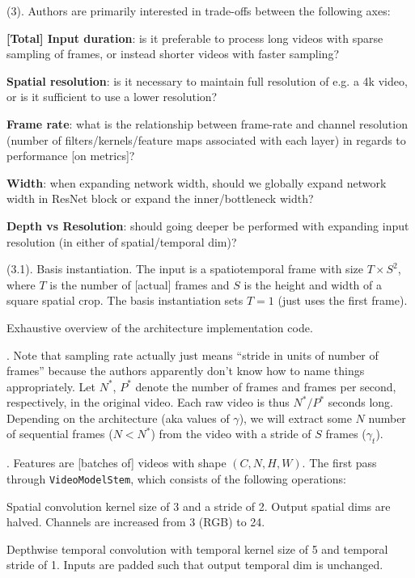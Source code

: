 \documentclass[11pt]{article}
\begin{document}
 (3). Authors are primarily interested in trade-offs between the following axes:
\begin{compactitem}
	\item \textbf{[Total] Input duration}: is it preferable to process long videos with sparse sampling of frames, or instead shorter videos with faster sampling? 
	
	\item \textbf{Spatial resolution}: is it necessary to maintain full resolution of e.g. a 4k video, or is it sufficient to use a lower resolution? 
	
	\item \textbf{Frame rate}: what is the relationship between frame-rate and channel resolution (number of filters/kernels/feature maps associated with each layer) in regards to performance [on metrics]?
	
	\item \textbf{Width}: when expanding network width, should we globally expand network width in ResNet block or expand the inner/bottleneck width?
	
	\item \textbf{Depth vs Resolution}: should going deeper be performed with expanding input resolution (in either of spatial/temporal dim)?
\end{compactitem}

 (3.1). Basis instantiation. The input is a spatiotemporal frame with size $T \times S^2$, where $T$ is the number of [actual] frames and $S$ is the height and width of a square spatial crop. The basis instantiation sets $T=1$ (just uses the first frame). 


\myspace
{}

Exhaustive overview of the architecture implementation code.

. Note that sampling rate actually just means ``stride in units of number of frames'' because the authors apparently don't know how to name things appropriately. Let $N^*$, $P^*$ denote the number of frames and frames per second, respectively, in the original video. Each raw video is thus $N^* / P^*$ seconds long. Depending on the architecture (aka values of $\gamma$), we will extract some $N$ number of sequential frames ($N < N^*$) from the video with a stride of $S$ frames ($\gamma_t$). 


. Features are [batches of] videos with shape $(C, N, H, W)$. The first pass through \texttt{VideoModelStem}, which consists of the following operations:
\begin{compactitem}
	\item Spatial convolution kernel size of 3 and a stride of 2.  Output spatial dims are halved. Channels are increased from 3 (RGB) to 24. 
	
	\item Depthwise temporal convolution with temporal kernel size of 5 and temporal stride of 1. Inputs are padded such that output temporal dim is unchanged. 
\end{compactitem}
\end{document}
